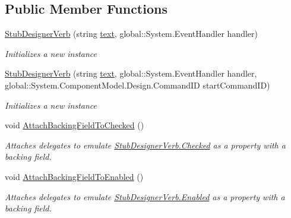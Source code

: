 \subsection*{Public Member Functions}
\begin{DoxyCompactItemize}
\item 
\hyperlink{class_system_1_1_component_model_1_1_design_1_1_fakes_1_1_stub_designer_verb_aa991f2768314ddf15ed0834e018f9389}{Stub\-Designer\-Verb} (string \hyperlink{jquery-1_810_82-vsdoc_8js_aa5b77da29631a344064bb3d20c8702de}{text}, global\-::\-System.\-Event\-Handler handler)
\begin{DoxyCompactList}\small\item\em Initializes a new instance\end{DoxyCompactList}\item 
\hyperlink{class_system_1_1_component_model_1_1_design_1_1_fakes_1_1_stub_designer_verb_a93ee6c9fe4f8c657be0d0c97197dbeb7}{Stub\-Designer\-Verb} (string \hyperlink{jquery-1_810_82-vsdoc_8js_aa5b77da29631a344064bb3d20c8702de}{text}, global\-::\-System.\-Event\-Handler handler, global\-::\-System.\-Component\-Model.\-Design.\-Command\-I\-D start\-Command\-I\-D)
\begin{DoxyCompactList}\small\item\em Initializes a new instance\end{DoxyCompactList}\item 
void \hyperlink{class_system_1_1_component_model_1_1_design_1_1_fakes_1_1_stub_designer_verb_a9ea375800389e676eb4c3b745e2f925f}{Attach\-Backing\-Field\-To\-Checked} ()
\begin{DoxyCompactList}\small\item\em Attaches delegates to emulate \hyperlink{class_system_1_1_component_model_1_1_design_1_1_fakes_1_1_stub_designer_verb_a8271d8370e0ba402d1a15da40b466018}{Stub\-Designer\-Verb.\-Checked} as a property with a backing field.\end{DoxyCompactList}\item 
void \hyperlink{class_system_1_1_component_model_1_1_design_1_1_fakes_1_1_stub_designer_verb_a754a83819dc3b666d4443d494e8d7cdf}{Attach\-Backing\-Field\-To\-Enabled} ()
\begin{DoxyCompactList}\small\item\em Attaches delegates to emulate \hyperlink{class_system_1_1_component_model_1_1_design_1_1_fakes_1_1_stub_designer_verb_a3dd3bae644b19c35b16fba384d0d342a}{Stub\-Designer\-Verb.\-Enabled} as a property with a backing field.\end{DoxyCompactList}\item 

\end{DoxyCompactItemize}
